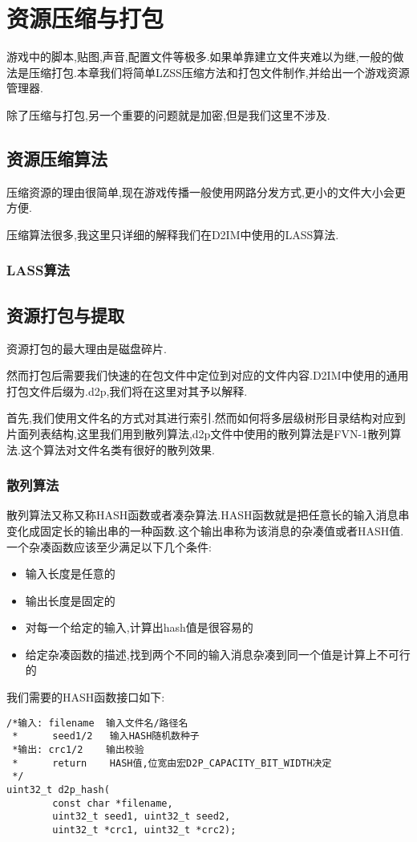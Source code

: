 \chapter{资源压缩与打包}
游戏中的脚本,贴图,声音,配置文件等极多.如果单靠建立文件夹难以为继,一般的做法是压缩打包.本章我们将简单LZSS压缩方法和打包文件制作,并给出一个游戏资源管理器.

除了压缩与打包,另一个重要的问题就是加密,但是我们这里不涉及.

\newpage
\section{资源压缩算法}
压缩资源的理由很简单,现在游戏传播一般使用网路分发方式,更小的文件大小会更方便.

压缩算法很多,我这里只详细的解释我们在D2IM中使用的LASS算法.

\subsection{LASS算法}
\section{资源打包与提取}
资源打包的最大理由是磁盘碎片.

然而打包后需要我们快速的在包文件中定位到对应的文件内容.D2IM中使用的通用打包文件后缀为.d2p,我们将在这里对其予以解释.

首先,我们使用文件名的方式对其进行索引.然而如何将多层级树形目录结构对应到片面列表结构,这里我们用到散列算法,d2p文件中使用的散列算法是FVN-1散列算法.这个算法对文件名类有很好的散列效果.
\subsection{散列算法}
散列算法又称又称HASH函数或者凑杂算法.HASH函数就是把任意长的输入消息串变化成固定长的输出串的一种函数.这个输出串称为该消息的杂凑值或者HASH值.一个杂凑函数应该至少满足以下几个条件:

\begin{itemize}
\item 输入长度是任意的
\item 输出长度是固定的
\item 对每一个给定的输入,计算出hash值是很容易的
\item 给定杂凑函数的描述,找到两个不同的输入消息杂凑到同一个值是计算上不可行的
\end{itemize}
我们需要的HASH函数接口如下:
\begin{lstlisting}
/*输入: filename  输入文件名/路径名
 *      seed1/2   输入HASH随机数种子
 *输出: crc1/2    输出校验
 *      return    HASH值,位宽由宏D2P_CAPACITY_BIT_WIDTH决定
 */
uint32_t d2p_hash(
        const char *filename, 
        uint32_t seed1, uint32_t seed2,
        uint32_t *crc1, uint32_t *crc2);
\end{lstlisting}
